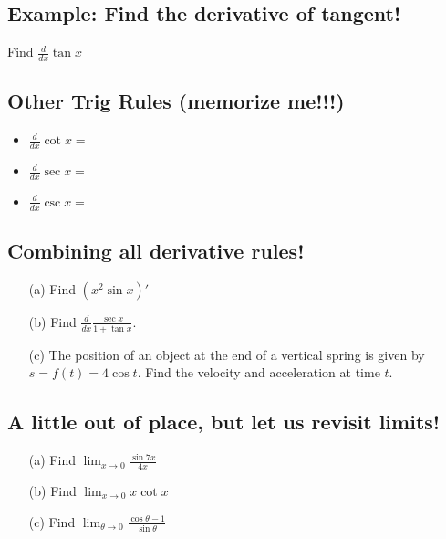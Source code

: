 \documentclass[12pt]{book}
\theoremstyle{definition}
\begin{document}
\subsection*{Example: Find the derivative of tangent!}
Find $\frac{d}{dx}\tan x$\vspace{4cm}
\begin{tcolorbox}
\subsection*{Other Trig Rules (memorize me!!!)}
\begin{itemize}
    \item $\displaystyle\frac{d}{dx}\cot x=$
    \item $\displaystyle\frac{d}{dx}\sec x=$
    \item $\displaystyle\frac{d}{dx}\csc x=$
\end{itemize}
\end{tcolorbox}
\subsection*{Combining all derivative rules!}
\begin{itemize}
    \item[(a)] Find $(x^2\sin x)'$\vspace{4cm}
    \item[(b)] Find $\frac{d}{dx}\frac{\sec x}{1+\tan x}$.\vspace{4cm}
    \item[(c)] The position of an object at the end of a vertical spring is given by $s=f(t)=4\cos t$. Find the velocity and acceleration at time $t$.
\end{itemize}
\raggedbottom
\clearpage
\subsection*{A little out of place, but let us revisit limits!}
\begin{itemize}
    \item[(a)] Find $\displaystyle \lim_{x\rightarrow 0}\frac{\sin 7x}{4x}$\vspace{5cm}
    \item[(b)] Find $\displaystyle \lim_{x\rightarrow 0}x\cot x$\vspace{5cm}
    \item[(c)]Find $\displaystyle \lim_{\theta\rightarrow 0}\frac{\cos \theta -1}{\sin \theta}$
\end{itemize}
\end{document}

